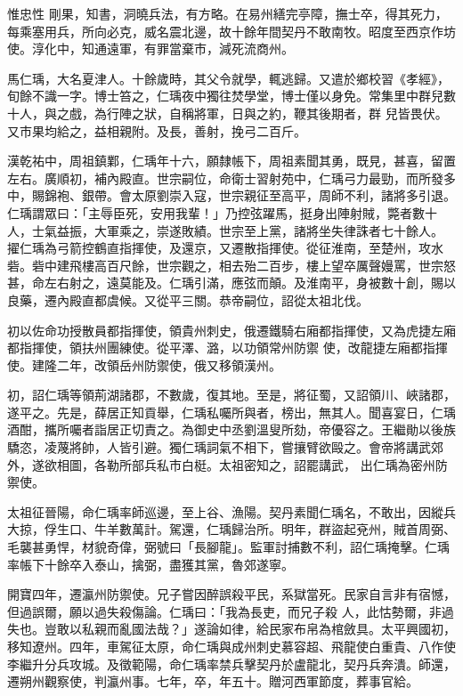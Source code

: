 \begin{pinyinscope}
 惟忠性
 剛果，知書，洞曉兵法，有方略。在易州繕完亭障，撫士卒，得其死力，每乘塞用兵，所向必克，威名震北邊，故十餘年間契丹不敢南牧。昭度至西京作坊使。淳化中，知通遠軍，有罪當棄市，減死流商州。



 馬仁瑀，大名夏津人。十餘歲時，其父令就學，輒逃歸。又遣於鄉校習《孝經》，旬餘不識一字。博士笞之，仁瑀夜中獨往焚學堂，博士僅以身免。常集里中群兒數十人，與之戲，為行陣之狀，自稱將軍，日與之約，鞭其後期者，群
 兒皆畏伏。又市果均給之，益相親附。及長，善射，挽弓二百斤。



 漢乾祐中，周祖鎮鄴，仁瑀年十六，願隸帳下，周祖素聞其勇，既見，甚喜，留置左右。廣順初，補內殿直。世宗嗣位，命衛士習射苑中，仁瑀弓力最勁，而所發多中，賜錦袍、銀帶。會太原劉崇入寇，世宗親征至高平，周師不利，諸將多引退。仁瑀謂眾曰：「主辱臣死，安用我輩！」乃控弦躍馬，挺身出陣射賊，斃者數十人，士氣益振，大軍乘之，崇遂敗績。世宗至上黨，諸將坐失律誅者七十餘人。
 擢仁瑀為弓箭控鶴直指揮使，及還京，又遷散指揮使。從征淮南，至楚州，攻水砦。砦中建飛樓高百尺餘，世宗觀之，相去殆二百步，樓上望卒厲聲嫚罵，世宗怒甚，命左右射之，遠莫能及。仁瑀引滿，應弦而顛。及淮南平，身被數十創，賜以良藥，遷內殿直都虞候。又從平三關。恭帝嗣位，詔從太祖北伐。



 初以佐命功授散員都指揮使，領貴州刺史，俄遷鐵騎右廂都指揮使，又為虎捷左廂都指揮使，領扶州團練使。從平澤、潞，以功領常州防禦
 使，改龍捷左廂都指揮使。建隆二年，改領岳州防禦使，俄又移領漢州。



 初，詔仁瑀等領荊湖諸郡，不數歲，復其地。至是，將征蜀，又詔領川、峽諸郡，遂平之。先是，薛居正知貢舉，仁瑀私囑所與者，榜出，無其人。聞喜宴日，仁瑀酒酣，攜所囑者詣居正切責之。為御史中丞劉溫叟所劾，帝優容之。王繼勛以後族驕恣，凌蔑將帥，人皆引避。獨仁瑀詞氣不相下，嘗攘臂欲毆之。會帝將講武郊外，遂欲相圖，各勒所部兵私市白梃。太祖密知之，詔罷講武，
 出仁瑀為密州防禦使。



 太祖征晉陽，命仁瑀率師巡邊，至上谷、漁陽。契丹素聞仁瑀名，不敢出，因縱兵大掠，俘生口、牛羊數萬計。駕還，仁瑀歸治所。明年，群盜起兗州，賊首周弼、毛襲甚勇悍，材貌奇偉，弼號曰「長腳龍」。監軍討捕數不利，詔仁瑀掩擊。仁瑀率帳下十餘卒入泰山，擒弼，盡獲其黨，魯郊遂寧。



 開寶四年，遷瀛州防禦使。兄子嘗因醉誤殺平民，系獄當死。民家自言非有宿憾，但過誤爾，願以過失殺傷論。仁瑀曰：「我為長吏，而兄子殺
 人，此怙勢爾，非過失也。豈敢以私親而亂國法哉？」遂論如律，給民家布帛為棺斂具。太平興國初，移知遼州。四年，車駕征太原，命仁瑀與成州刺史慕容超、飛龍使白重貴、八作使李繼升分兵攻城。及徵範陽，命仁瑀率禁兵擊契丹於盧龍北，契丹兵奔潰。師還，遷朔州觀察使，判瀛州事。七年，卒，年五十。贈河西軍節度，葬事官給。




\end{pinyinscope}
